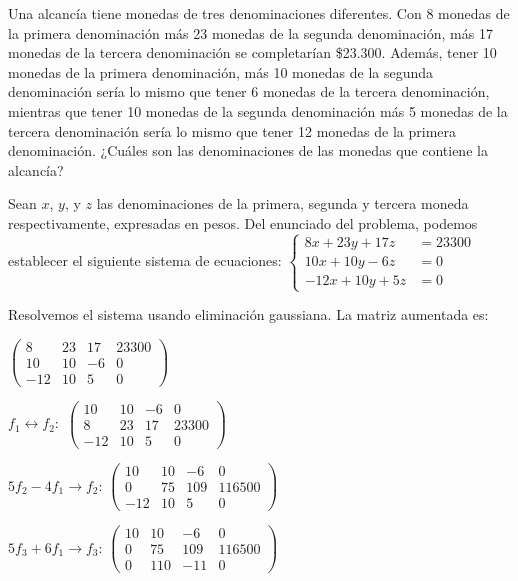 \begin{prob}
Una alcancía tiene monedas de tres denominaciones diferentes. Con 8 monedas de la primera denominación más 23 monedas de la segunda denominación, más 17 monedas de la tercera denominación se completarían \$23.300. Además, tener 10 monedas de la primera denominación, más 10 monedas de la segunda denominación sería lo mismo que tener 6 monedas de la tercera denominación, mientras que tener 10 monedas de la segunda denominación más 5 monedas de la tercera denominación sería lo mismo que tener 12 monedas de la primera denominación. ¿Cuáles son las denominaciones de las monedas que contiene la alcancía?

\begin{myproof} Sean $x$, $y$, y $z$ las denominaciones de la primera, segunda y tercera moneda respectivamente, expresadas en pesos. Del enunciado del problema, podemos establecer el siguiente sistema de ecuaciones: $\begin{cases}
8x + 23y + 17z &= 23300  \\
10x + 10y - 6z &= 0  \\
-12x + 10y + 5z &= 0 
\end{cases}$

Resolvemos el sistema usando eliminación gaussiana. La matriz aumentada es:

$\left(\begin{array}{ccc|c}
8 & 23 & 17 & 23300 \\
10 & 10 & -6 & 0 \\
-12 & 10 & 5 & 0
\end{array}\right)$

$f_1 \leftrightarrow f_2:$ $\left(\begin{array}{ccc|c}
10 & 10 & -6 & 0 \\
8 & 23 & 17 & 23300 \\
-12 & 10 & 5 & 0
\end{array}\right)$

$5f_2 - 4f_1 \to f_2$: $\left(\begin{array}{ccc|c}
10 & 10 & -6 & 0 \\
0 & 75 & 109 & 116500 \\
-12 & 10 & 5 & 0
\end{array}\right)$

$5f_3 + 6f_1 \to f_3$: $\left(\begin{array}{ccc|c}
10 & 10 & -6 & 0 \\
0 & 75 & 109 & 116500 \\
0 & 110 & -11 & 0
\end{array}\right)$


\end{myproof}
\end{prob}
